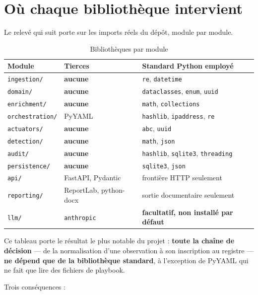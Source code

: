 \section{Où chaque bibliothèque intervient}

Le relevé qui suit porte sur les imports réels du dépôt, module par module.

\begin{table}[h]
\centering
\begin{tabular}{@{}p{4.4cm}p{3.6cm}p{5.8cm}@{}}
\toprule
\textbf{Module} & \textbf{Tierces} & \textbf{Standard Python employé} \\
\midrule
\texttt{ingestion/} & \textbf{aucune} & \texttt{re}, \texttt{datetime} \\[4pt]
\texttt{domain/} & \textbf{aucune} & \texttt{dataclasses}, \texttt{enum},
\texttt{uuid} \\[4pt]
\texttt{enrichment/} & \textbf{aucune} & \texttt{math}, \texttt{collections} \\[4pt]
\texttt{orchestration/} & PyYAML & \texttt{hashlib}, \texttt{ipaddress},
\texttt{re} \\[4pt]
\texttt{actuators/} & \textbf{aucune} & \texttt{abc}, \texttt{uuid} \\[4pt]
\texttt{detection/} & \textbf{aucune} & \texttt{math}, \texttt{json} \\[4pt]
\texttt{audit/} & \textbf{aucune} & \texttt{hashlib}, \texttt{sqlite3},
\texttt{threading} \\[4pt]
\texttt{persistence/} & \textbf{aucune} & \texttt{sqlite3}, \texttt{json} \\[4pt]
\texttt{api/} & FastAPI, Pydantic & frontière HTTP seulement \\[4pt]
\texttt{reporting/} & ReportLab, python-docx & sortie documentaire seulement \\[4pt]
\texttt{llm/} & \texttt{anthropic} & \textbf{facultatif, non installé par
défaut} \\
\bottomrule
\end{tabular}
\caption{Bibliothèques par module}
\end{table}

Ce tableau porte le résultat le plus notable du projet : \textbf{toute la
chaîne de décision} — de la normalisation d'une observation à son inscription
au registre — \textbf{ne dépend que de la bibliothèque standard}, à l'exception
de PyYAML qui ne fait que lire des fichiers de playbook.

Trois conséquences :

